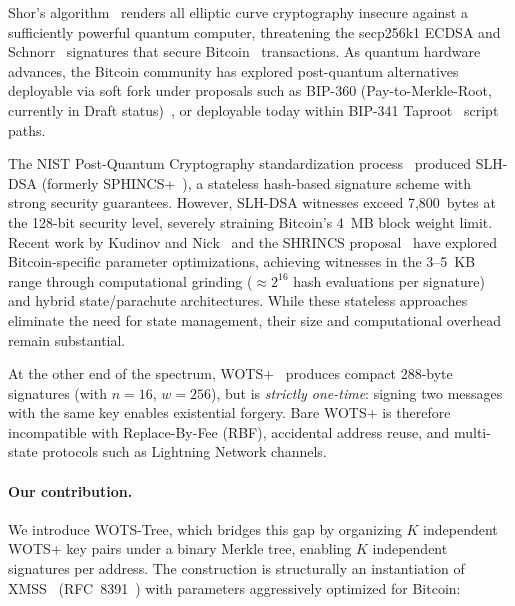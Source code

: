 \documentclass[11pt,a4paper]{article}
\theoremstyle{definition}
\begin{document}
Shor's algorithm~\cite{shor1994algorithms} renders all elliptic curve cryptography insecure against a sufficiently powerful quantum computer, threatening the secp256k1 ECDSA and Schnorr~\cite{bip340} signatures that secure Bitcoin~\cite{nakamoto2008bitcoin} transactions. As quantum hardware advances, the Bitcoin community has explored post-quantum alternatives deployable via soft fork under proposals such as BIP-360 (Pay-to-Merkle-Root, currently in Draft status)~\cite{bip360}, or deployable today within BIP-341 Taproot~\cite{bip341} script paths.

The NIST Post-Quantum Cryptography standardization process~\cite{nist2024slhdsa} produced SLH-DSA (formerly SPHINCS+~\cite{bernstein2019sphincs}), a stateless hash-based signature scheme with strong security guarantees. However, SLH-DSA witnesses exceed 7{,}800~bytes at the 128-bit security level, severely straining Bitcoin's 4~MB block weight limit. Recent work by Kudinov and Nick~\cite{kudinov2025} and the SHRINCS proposal~\cite{nick2025shrincs} have explored Bitcoin-specific parameter optimizations, achieving witnesses in the 3--5~KB range through computational grinding ($\approx 2^{16}$ hash evaluations per signature) and hybrid state/parachute architectures. While these stateless approaches eliminate the need for state management, their size and computational overhead remain substantial.

At the other end of the spectrum, WOTS+~\cite{hulsing2013wots} produces compact 288-byte signatures (with $n=16$, $w=256$), but is \emph{strictly one-time}: signing two messages with the same key enables existential forgery. Bare WOTS+ is therefore incompatible with Replace-By-Fee (RBF), accidental address reuse, and multi-state protocols such as Lightning Network channels.

\paragraph{Our contribution.} We introduce WOTS-Tree, which bridges this gap by organizing $K$ independent WOTS+ key pairs under a binary Merkle tree, enabling $K$ independent signatures per address. The construction is structurally an instantiation of XMSS~\cite{buchmann2011xmss} (RFC~8391~\cite{rfc8391}) with parameters aggressively optimized for Bitcoin:
\end{document}
